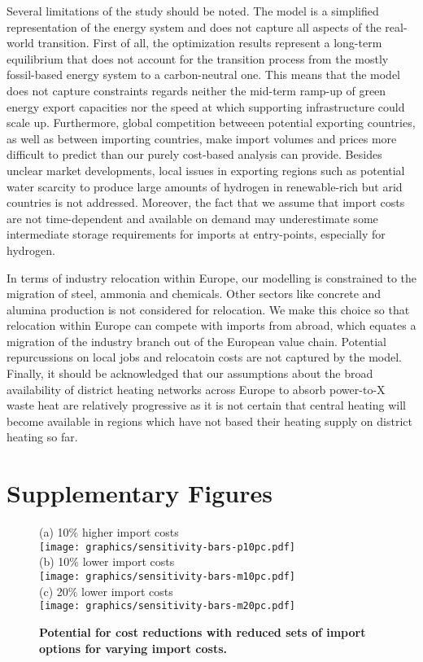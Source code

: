\documentclass[5p,10pt]{elsarticle}
\begin{document}
Several limitations of the study should be noted. The model is a simplified
representation of the energy system and does not capture all aspects of the
real-world transition. First of all, the optimization results represent a
long-term equilibrium that does not account for the transition process from the
mostly fossil-based energy system to a carbon-neutral one. This means that the
model does not capture constraints regards neither the mid-term ramp-up of green
energy export capacities nor the speed at which supporting infrastructure could
scale up. Furthermore, global competition betweeen potential exporting
countries, as well as between importing countries, make import volumes and
prices more difficult to predict than our purely cost-based analysis can
provide. Besides unclear market developments, local issues in exporting regions
such as potential water scarcity to produce large amounts of hydrogen in
renewable-rich but arid countries is not addressed. Moreover, the fact that we
assume that import costs are not time-dependent and available on demand may
underestimate some intermediate storage requirements for imports at
entry-points, especially for hydrogen.

In terms of industry relocation within Europe, our modelling is constrained to
the migration of steel, ammonia and chemicals. Other sectors like concrete and
alumina production is not considered for relocation. We make this choice so that
relocation within Europe can compete with imports from abroad, which equates a
migration of the industry branch out of the European value chain. Potential
repurcussions on local jobs and relocatoin costs are not captured by the model.
Finally, it should be acknowledged that our assumptions about the broad
availability of district heating networks across Europe to absorb
\mbox{power-to-X} waste heat are relatively progressive as it is not certain
that central heating will become available in regions which have not based their
heating supply on district heating so far.

\section{Supplementary Figures}

\begin{figure}[!htb]
    \footnotesize
    (a) 10\% higher import costs \\
    \texttt{[image: graphics/sensitivity-bars-p10pc.pdf]} \\
    (b) 10\% lower import costs \\
    \texttt{[image: graphics/sensitivity-bars-m10pc.pdf]} \\
    (c) 20\% lower import costs \\
    \texttt{[image: graphics/sensitivity-bars-m20pc.pdf]} \\
    \caption{\textbf{Potential for cost reductions with reduced sets of import options for varying import costs.}}
    \label{fig:si:subsets}
\end{figure}
\end{document}
